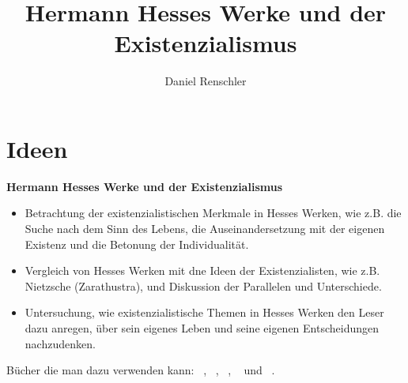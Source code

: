 \documentclass{article}
\title{Hermann Hesses Werke und der Existenzialismus}
\author{Daniel Renschler}
\date{}
\begin{document}
\maketitle

\section{Ideen}
\textbf{Hermann Hesses Werke und der Existenzialismus}
\begin{itemize}
  \item Betrachtung der existenzialistischen Merkmale in Hesses Werken, wie
    z.B. die Suche nach dem Sinn des Lebens, die Auseinandersetzung mit der
    eigenen Existenz und die Betonung der Individualit\"at.
  \item Vergleich von Hesses Werken mit dne Ideen der Existenzialisten, wie
    z.B. Nietzsche (Zarathustra), und Diskussion der Parallelen und
    Unterschiede.
  \item Untersuchung, wie existenzialistische Themen in Hesses Werken den Leser
    dazu anregen, \"uber sein eigenes Leben und seine eigenen Entscheidungen
    nachzudenken.
\end{itemize}

B\"ucher die man dazu verwenden kann: ~\cite{hesse1927steppenwolf},
~\cite{nietzsche1883also}, ~\cite{hesse1922siddhartha},
~\cite{hesse1930narziss} und ~\cite{nietzsche1886jenseits}.



\printbibliography
\end{document}
